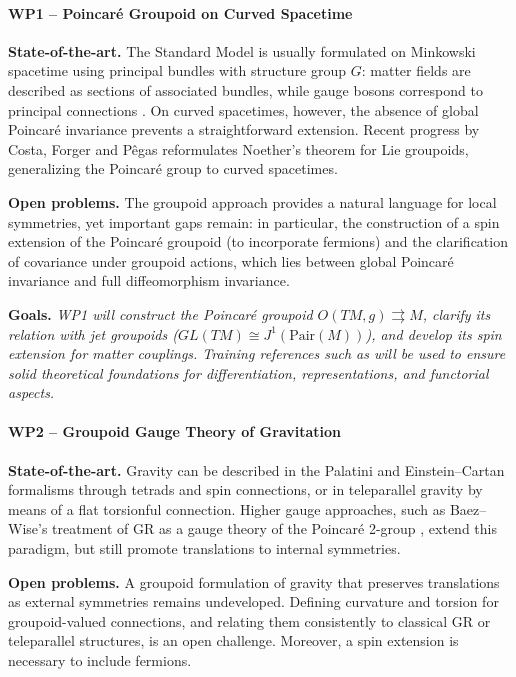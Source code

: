 \documentclass[11pt]{msca-pf}
\begin{document}
\paragraph{WP1 – Poincaré Groupoid on Curved Spacetime}  

\textbf{State-of-the-art.} The Standard Model is usually formulated on Minkowski spacetime using principal bundles with structure group $G$: matter fields are described as sections of associated bundles, while gauge bosons correspond to principal connections \cite{Hamilton2017,Bleeker2005}. On curved spacetimes, however, the absence of global Poincaré invariance prevents a straightforward extension. Recent progress by Costa, Forger and Pêgas \cite{Costa-Forger-Pegas-2018,Costa-Forger-Pegas-2021} reformulates Noether’s theorem for Lie groupoids, generalizing the Poincaré group to curved spacetimes.  

\textbf{Open problems.} The groupoid approach provides a natural language for local symmetries, yet important gaps remain: in particular, the construction of a spin extension of the Poincaré groupoid (to incorporate fermions) and the clarification of covariance under groupoid actions, which lies between global Poincaré invariance and full diffeomorphism invariance.  

\textbf{Goals.} \emph{WP1 will construct the Poincaré groupoid $O(TM,g)\rightrightarrows M$, clarify its relation with jet groupoids ($GL(TM)\cong J^1(\mathrm{Pair}(M))$), and develop its spin extension for matter couplings. Training references such as \cite{Mackenzie2005,MoerdijkMrcun2003,MeinrenkenNotes,Weinstein1996,OlverSGWQ} will be used to ensure solid theoretical foundations for differentiation, representations, and functorial aspects.}

\paragraph{WP2 – Groupoid Gauge Theory of Gravitation}  

\textbf{State-of-the-art.} Gravity can be described in the Palatini and Einstein–Cartan formalisms through tetrads and spin connections, or in teleparallel gravity by means of a flat torsionful connection. Higher gauge approaches, such as Baez–Wise’s treatment of GR as a gauge theory of the Poincaré 2-group \cite{BaezWise2005}, extend this paradigm, but still promote translations to internal symmetries.  

\textbf{Open problems.} A groupoid formulation of gravity that preserves translations as external symmetries remains undeveloped. Defining curvature and torsion for groupoid-valued connections, and relating them consistently to classical GR or teleparallel structures, is an open challenge. Moreover, a spin extension is necessary to include fermions.  
\end{document}
